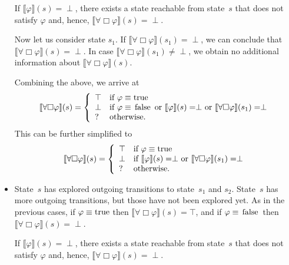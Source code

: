 \documentclass[12pt]{article}
\newcommand{\always}{\Box}
\newcommand{\TRUE}{\mbox{\lstinline{true}}}
\newcommand{\FALSE}{\mbox{\lstinline{false}}}
\theoremstyle{definition}
\newcommand{\satisfaction}[1]{\llbracket #1 \rrbracket}
\begin{document}
\begin{itemize}
If $\satisfaction{\varphi}(s) = \perp$, there exists a state reachable from state~$s$ that does not satisfy $\varphi$ and, hence, $\satisfaction{\forall \always \varphi}(s) = \perp$.

Now let us consider state $s_1$.  If $\satisfaction{\forall \always \varphi}(s_1) = \perp$, we can conclude that $\satisfaction{\forall \always \varphi}(s) = \perp$.  In case $\satisfaction{\forall \always \varphi}(s_1)\not= \perp$, we obtain no additional information about $\satisfaction{\forall \always \varphi}(s)$.

Combining the above, we arrive at
\[
\satisfaction{\forall \always \varphi}(s) = \left \{
\begin{array}{ll}
\top & \mbox{if $\varphi \equiv \TRUE$}\\
\perp & \mbox{if $\varphi \equiv \FALSE$ or $\satisfaction{\varphi}(s) = \perp$ or $\satisfaction{\forall \always \varphi}(s_1) = \perp$}\\
? & \mbox{otherwise.}
\end{array}
\right .
\]
This can be further simplified to
\[
\satisfaction{\forall \always \varphi}(s) = \left \{
\begin{array}{ll}
\top & \mbox{if $\varphi \equiv \TRUE$}\\
\perp & \mbox{if $\satisfaction{\varphi}(s) = \perp$ or $\satisfaction{\forall \always \varphi}(s_1) = \perp$}\\
? & \mbox{otherwise.}
\end{array}
\right .
\]
\item
State~$s$ has explored outgoing transitions to state~$s_1$ and $s_2$.  State~$s$ has more outgoing transitions, but those have not been explored yet.   As in the previous cases, if  $\varphi \equiv \TRUE$ then $\satisfaction{\forall \always \varphi}(s) = \top$, and if $\varphi \equiv \FALSE$ then $\satisfaction{\forall \always \varphi}(s) = \perp$. 

If $\satisfaction{\varphi}(s) = \perp$, there exists a state reachable from state~$s$ that does not satisfy $\varphi$ and, hence, $\satisfaction{\forall \always \varphi}(s) = \perp$.


\end{itemize}
\end{document}
